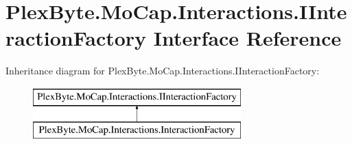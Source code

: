 \hypertarget{interface_plex_byte_1_1_mo_cap_1_1_interactions_1_1_i_interaction_factory}{}\section{Plex\+Byte.\+Mo\+Cap.\+Interactions.\+I\+Interaction\+Factory Interface Reference}
\label{interface_plex_byte_1_1_mo_cap_1_1_interactions_1_1_i_interaction_factory}
Inheritance diagram for Plex\+Byte.\+Mo\+Cap.\+Interactions.\+I\+Interaction\+Factory\+:\begin{figure}[H]
\begin{center}
\leavevmode
\includegraphics[height=2.000000cm]{interface_plex_byte_1_1_mo_cap_1_1_interactions_1_1_i_interaction_factory}
\end{center}
\end{figure}
